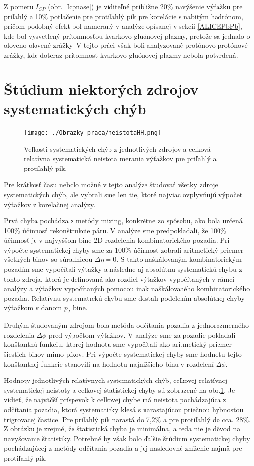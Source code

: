 \documentclass[thesismargins, thesislinespacing]{rnthesis}
\begin{document}
Z pomeru $I_{CP}$ (obr. \ref{Icpnase}) je viditeľné približne 20\% navýšenie výťažku pre priľahlý a 10\% potlačenie pre protiľahlý pík pre korelácie s nabitým hadrónom, pričom podobný efekt bol nameraný v analýze opísanej v sekcii \ref{ALICEPbPb}, kde bol vysvetlený prí\-tom\-nos\-ťou kvarkovo-gluónovej plazmy, pretože sa jednalo o oloveno-olovené zrážky. V tejto práci však boli analyzované protónovo-protónové zrážky, kde doteraz prítomnosť kvarkovo-gluónovej plazmy nebola potvrdená.

\section{Štúdium niektorých zdrojov systematických chýb}

\begin{figure}[hbtp!]
	\centering
	\texttt{[image: ./Obrazky\_praca/neistotaHH.png]}
	\caption{Veľkosti systematických chýb z jednotlivých zdrojov a celková relatívna systematická neistota merania výťažkov pre priľahlý a protiľahlý pík.}
	\label{systchyba}
\end{figure}

Pre krátkosť času nebolo možné v tejto analýze študovať všetky zdroje systematických chýb, ale vybrali sme len tie, ktoré najviac ovplyvňujú výpočet výťažkov z korelačnej analýzy.

Prvá chyba pochádza z metódy mixing, konkrétne zo spôsobu, ako bola určená 100\% účinnosť rekonštrukcie páru. V analýze sme predpokladali, že 100\% účinnosť je v najvyššom bine 2D rozdelenia kombinatorického pozadia. Pri výpočte systematickej chyby sme za 100\% účinnosť zobrali aritmetický priemer všetkých binov so súradnicou $\Delta\eta=0$. S takto naškálovaným kombinatorickým pozadím sme vypočítali výťažky a následne aj absolútnu systematickú chybu z tohto zdroja, ktorá je definovaná ako rozdiel výťažkov vypočítaných v rámci analýzy a výťažkov vypočítaných pomocou inak naškálovaného kombinatorického pozadia. Relatívnu systematickú chybu sme dostali podelením absolútnej chyby výťažkom v danom $p_T$ bine.

Druhým študovaným zdrojom bola metóda odčítania pozadia z jednorozmerného rozdelenia $\Delta\phi$ pred výpočtom výťažkov. V analýze sme za pozadie pokladali konštantnú funkciu, ktorej hodnotu sme vypočítali ako aritmetický priemer šiestich binov mimo píkov. Pri výpočte systematickej chyby sme hodnotu tejto konštantnej funkcie stanovili na hodnotu najnižšieho binu v rozdelení $\Delta\phi$. 

Hodnoty jednotlivých relatívnych systematických chýb, celkovej relatívnej systematickej neistoty a celkovej štatistickej chyby sú zobrazené na obr.\ref{systchyba}. Je vidieť, že najväčší príspevok k celkovej chybe má neistota pochádzajúca z odčítania pozadia, ktorá systematicky klesá s narastajúcou priečnou hybnosťou trigrovacej častice. Pre priľahlý pík narastá do 7,2\% a pre protiľahlý do cca. 28\%.  Z obrázku je zrejmé, že štatistická chyba je minimálna, a teda nie je dôvod na navyšovanie štatistiky. Potrebné by však bolo ďalšie štúdium systematickej chyby pochádzajúcej z metódy odčítania pozadia a jej nasledovné zníženie najmä pre protiľahlý pík. 
\end{document}
